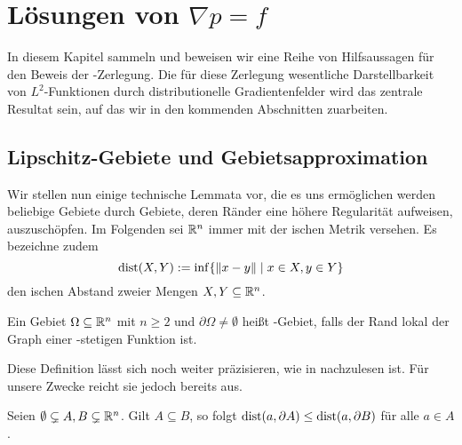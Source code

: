 \chapter{Lösungen von $\nabla p = f$}

In diesem Kapitel sammeln und beweisen wir eine Reihe von Hilfsaussagen für den Beweis der \helmholtz\hyp{}Zerlegung.
Die für diese Zerlegung wesentliche Darstellbarkeit von $L^2$\hyp{}Funktionen durch distributionelle Gradientenfelder wird das zentrale Resultat sein, auf das wir in den kommenden Abschnitten zuarbeiten.


\section{Lipschitz-Gebiete und Gebietsapproximation}
\label{sec:lipschitzDomains}

Wir stellen nun einige technische Lemmata vor, die es uns ermöglichen werden beliebige Gebiete durch Gebiete, deren Ränder eine höhere Regularität aufweisen, auszuschöpfen.
Im Folgenden sei $\mathbb{R}^n$ immer mit der \euklid ischen Metrik versehen. Es bezeichne zudem
$$
\operatorname{dist}(X,Y) := \inf\{ \lVert x - y \rVert \mid x \in X, y \in Y\}
$$
den \euklid ischen Abstand zweier Mengen $X,Y \subseteq \mathbb{R}^n$.

\begin{defn}
  Ein Gebiet $\Omega \subseteq \mathbb{R}^n$ mit $n \geq 2$ und $\partial \Omega \neq \emptyset$ heißt \lipschitz\hyp{}Gebiet, falls der Rand lokal der Graph einer \lipschitz\hyp{}stetigen Funktion ist.
\end{defn}

Diese Definition lässt sich noch weiter präzisieren, wie in \cite[S.25, 3.2]{sohr2001navier} nachzulesen ist. Für unsere Zwecke reicht sie jedoch bereits aus.

\begin{lem}
  \label{lem:distBoundary}
  Seien $\emptyset \subsetneq A,B \subsetneq \mathbb{R}^n$. Gilt $A \subseteq B$, so folgt $\operatorname{dist}(a,\partial A) \leq \operatorname{dist}(a, \partial B)$ für alle $a \in A$.
\end{lem}

